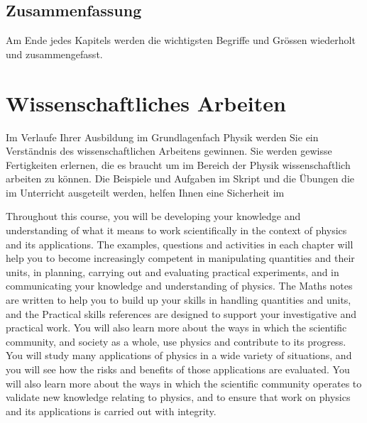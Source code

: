 \documentclass[11pt]{scrbook}
\begin{document}
\section{Zusammenfassung}
Am Ende jedes Kapitels werden die wichtigsten Begriffe und Grössen wiederholt und zusammengefasst.

\chapter*{Wissenschaftliches Arbeiten}
Im Verlaufe Ihrer Ausbildung im Grundlagenfach Physik werden Sie ein Verständnis des wissenschaftlichen Arbeitens gewinnen. Sie werden gewisse Fertigkeiten erlernen, die es braucht um im Bereich der Physik wissenschaftlich arbeiten zu können. Die Beispiele und Aufgaben im Skript und die Übungen die im Unterricht ausgeteilt werden, helfen Ihnen eine Sicherheit im 

Throughout this course, you will be developing your
knowledge and understanding of what it means to work
scientifically in the context of physics and its applications.
The examples, questions and activities in each chapter will
help you to become increasingly competent in manipulating
quantities and their units, in planning, carrying out and
evaluating practical experiments, and in communicating your
knowledge and understanding of physics. The Maths notes
are written to help you to build up your skills in handling
quantities and units, and the Practical skills references are
designed to support your investigative and practical work.
You will also learn more about the ways in which the scientific
community, and society as a whole, use physics and contribute
to its progress. You will study many applications of physics in
a wide variety of situations, and you will see how the risks and
benefits of those applications are evaluated. You will also learn
more about the ways in which the scientific community operates
to validate new knowledge relating to physics, and to ensure that
work on physics and its applications is carried out with integrity.
\end{document}
